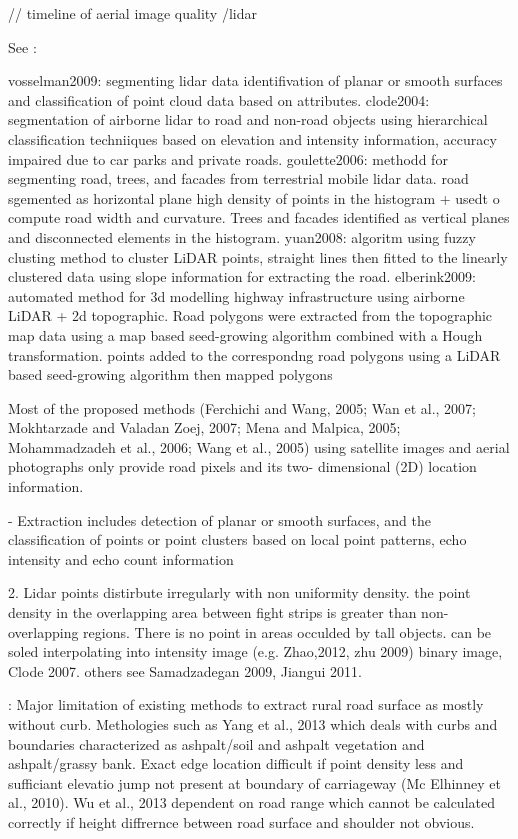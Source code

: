 \begin{multicols}{2}
// timeline of aerial image quality /lidar

See \citep{kumar2013}:

vosselman2009: segmenting lidar data identifivation of planar or smooth surfaces and classification of point cloud data based on attributes.
clode2004: segmentation of airborne lidar to road and non-road objects using hierarchical classification techniiques based on elevation and intensity information, accuracy impaired due to car parks and private roads.
goulette2006: methodd for segmenting road, trees, and facades from terrestrial mobile lidar data. road sgemented as horizontal plane high density of points in the histogram + usedt o compute road width and curvature. Trees and facades identified as vertical planes and disconnected elements in the histogram.
yuan2008: algoritm using fuzzy clusting method to cluster LiDAR points, straight lines then fitted to the linearly clustered data using slope information for extracting the road.
elberink2009: automated method for 3d modelling highway infrastructure using airborne LiDAR + 2d topographic. Road polygons were extracted from the topographic map data using a map based seed-growing algorithm combined with a Hough transformation. points added to the correspondng road polygons using a LiDAR based seed-growing algorithm then mapped polygons

Most of the proposed methods (Ferchichi and Wang, 2005; Wan et al., 2007; Mokhtarzade and Valadan Zoej, 2007; Mena and Malpica, 2005; Mohammadzadeh et al., 2006; Wang et al., 2005) using satellite images and aerial photographs only provide road pixels and its two- dimensional (2D) location information.

- Extraction includes detection of planar or smooth surfaces, and the classification of points or point clusters based on local point patterns, echo intensity and echo count information \citep{vosselman2004;darmawati2008}

2. Lidar points distirbute irregularly with non uniformity density. the point density in the overlapping area between fight strips is greater than non-overlapping regions. There is no point in areas occulded by tall objects. can be soled interpolating into intensity image (e.g. Zhao,2012, zhu 2009) binary image, Clode 2007. others see Samadzadegan 2009, Jiangui 2011.

\citep{yadav2018}: Major limitation of existing methods to extract rural road surface as mostly without curb. Methologies such as Yang et al., 2013 which deals with curbs and boundaries characterized as ashpalt/soil and ashpalt vegetation and ashpalt/grassy bank. Exact edge location difficult if point density less and sufficiant elevatio jump not present at boundary of carriageway (Mc Elhinney et al., 2010). Wu et al., 2013 dependent on road range which cannot be calculated correctly if height diffrernce between road surface and shoulder not obvious.




\end{multicols}
